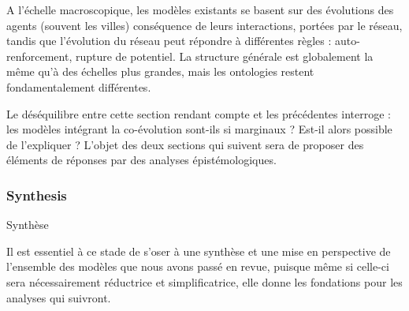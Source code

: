A l'échelle macroscopique, les modèles existants se basent sur des évolutions des agents (souvent les villes) conséquence de leurs interactions, portées par le réseau, tandis que l'évolution du réseau peut répondre à différentes règles : auto-renforcement, rupture de potentiel. La structure générale est globalement la même qu'à des échelles plus grandes, mais les ontologies restent fondamentalement différentes.



Le déséquilibre entre cette section rendant compte  et les précédentes interroge : les modèles intégrant la co-évolution sont-ils si marginaux ? Est-il alors possible de l'expliquer ? L'objet des deux sections qui suivent sera de proposer des éléments de réponses par des analyses épistémologiques.






\subsubsection*{Synthesis}{Synthèse}

Il est essentiel à ce stade de s'oser à une synthèse et une mise en perspective de l'ensemble des modèles que nous avons passé en revue, puisque même si celle-ci sera nécessairement réductrice et simplificatrice, elle donne les fondations pour les analyses qui suivront.







\stars










